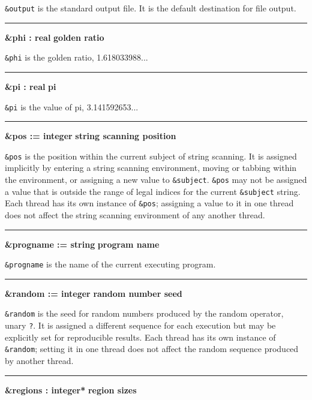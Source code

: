 \noindent
{}\texttt{\&output} is the standard
output file. It is the default destination for file output.

\bigskip\hrule\vspace{0.1cm}
\noindent
{\bf \&phi : real } \hfill {\bf golden ratio}

\noindent
{}\texttt{\&phi}
is the golden ratio, 1.618033988...

\bigskip\hrule\vspace{0.1cm}
\noindent
{\bf \&pi : real } \hfill {\bf pi}

\noindent
{}\texttt{\&pi} is the value of pi, 3.141592653...

\bigskip\hrule\vspace{0.1cm}
\noindent
{\bf \&pos := integer } \hfill {\bf string scanning position}

\noindent
{}\texttt{\&pos} is the position within the
current subject of string scanning. It is assigned implicitly by
entering a string scanning environment, moving or tabbing within the
environment, or assigning a new value to \texttt{\&subject}.
\texttt{\&pos} may not be assigned a value that is outside the range of
legal indices for the current \texttt{\&subject} string.
Each thread has its own instance of
\texttt{\&pos}; \ConcurrencyIssue assigning a value to it in one
thread does not affect the string scanning environment of any another thread.

\bigskip\hrule\vspace{0.1cm}
\noindent
{\bf \&progname := string } \hfill {\bf program name}

\noindent
{}\texttt{\&progname} is the name of the current
executing program.

\bigskip\hrule\vspace{0.1cm}
\noindent
{\bf \&random := integer } \hfill {\bf random number seed}

\noindent
{}\texttt{\&random} is the seed for random
numbers produced by the random operator, unary \texttt{?}. It is
assigned a different sequence for each execution but may be explicitly
set for reproducible results. Each thread has its own instance of
\texttt{\&random}; \ConcurrencyIssue setting it in one thread does
not affect the random sequence produced by another thread.
\bigskip\hrule\vspace{0.1cm}
\noindent
{\bf \&regions : integer* } \hfill {\bf region sizes}

